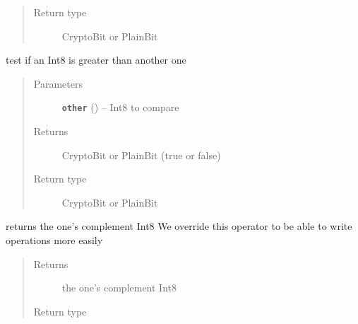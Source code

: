 \documentclass[letterpaper,10pt,english]{sphinxmanual}
\begin{document}
\begin{fulllineitems}
\begin{fulllineitems}
\begin{quote}
\begin{description}
\item[{Return type}] \leavevmode
CryptoBit or PlainBit

\end{description}\end{quote}

\end{fulllineitems}


\begin{fulllineitems}
\label{datatypes.integers:datatypes.integers.Int8.Int8.__gt__}
test if an Int8 is greater than another one
\begin{quote}\begin{description}
\item[{Parameters}] \leavevmode
\textbf{\texttt{other}} ({\hyperref[datatypes.integers:datatypes.integers.Int8.Int8]{}}) -- Int8 to compare

\item[{Returns}] \leavevmode
CryptoBit or PlainBit (true or false)

\item[{Return type}] \leavevmode
CryptoBit or PlainBit

\end{description}\end{quote}

\end{fulllineitems}


\begin{fulllineitems}
\label{datatypes.integers:datatypes.integers.Int8.Int8.__invert__}
returns the one's complement Int8
We override this operator to be able to write operations more easily
\begin{quote}\begin{description}
\item[{Returns}] \leavevmode
the one's complement Int8

\item[{Return type}] \leavevmode
{\hyperref[datatypes.integers:datatypes.integers.Int8.Int8]{}}

\end{description}\end{quote}


\end{fulllineitems}
\end{fulllineitems}
\end{document}

